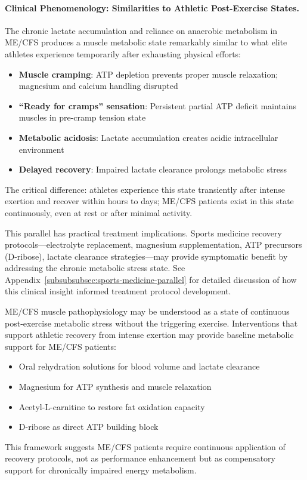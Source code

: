 \paragraph{Clinical Phenomenology: Similarities to Athletic Post-Exercise States.}

The chronic lactate accumulation and reliance on anaerobic metabolism in ME/CFS produces a muscle metabolic state remarkably similar to what elite athletes experience temporarily after exhausting physical efforts:

\begin{itemize}
    \item \textbf{Muscle cramping}: ATP depletion prevents proper muscle relaxation; magnesium and calcium handling disrupted
    \item \textbf{``Ready for cramps'' sensation}: Persistent partial ATP deficit maintains muscles in pre-cramp tension state
    \item \textbf{Metabolic acidosis}: Lactate accumulation creates acidic intracellular environment
    \item \textbf{Delayed recovery}: Impaired lactate clearance prolongs metabolic stress
\end{itemize}

The critical difference: athletes experience this state transiently after intense exertion and recover within hours to days; ME/CFS patients exist in this state continuously, even at rest or after minimal activity.

This parallel has practical treatment implications. Sports medicine recovery protocols---electrolyte replacement, magnesium supplementation, ATP precursors (D-ribose), lactate clearance strategies---may provide symptomatic benefit by addressing the chronic metabolic stress state. See Appendix~\ref{subsubsubsec:sports-medicine-parallel} for detailed discussion of how this clinical insight informed treatment protocol development.

\begin{observation}
ME/CFS muscle pathophysiology may be understood as a state of continuous post-exercise metabolic stress without the triggering exercise. Interventions that support athletic recovery from intense exertion may provide baseline metabolic support for ME/CFS patients:
\begin{itemize}
    \item Oral rehydration solutions for blood volume and lactate clearance
    \item Magnesium for ATP synthesis and muscle relaxation
    \item Acetyl-L-carnitine to restore fat oxidation capacity
    \item D-ribose as direct ATP building block
\end{itemize}

This framework suggests ME/CFS patients require continuous application of recovery protocols, not as performance enhancement but as compensatory support for chronically impaired energy metabolism.
\end{observation}

